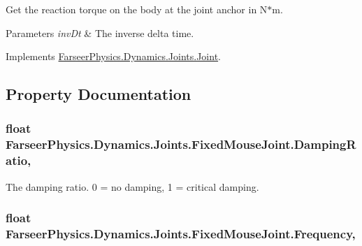 Get the reaction torque on the body at the joint anchor in N$\ast$m. 


\begin{DoxyParams}{Parameters}
{\em inv\+Dt} & The inverse delta time.\\
\hline
\end{DoxyParams}


Implements \hyperlink{class_farseer_physics_1_1_dynamics_1_1_joints_1_1_joint_a21899d3bdf15c22ef4dc288ed2082cbc}{Farseer\+Physics.\+Dynamics.\+Joints.\+Joint}.



\subsection{Property Documentation}
\hypertarget{class_farseer_physics_1_1_dynamics_1_1_joints_1_1_fixed_mouse_joint_a311969f45e435d7547b30c5adb8d4289}{
\subsubsection[{Damping\+Ratio}]{\setlength{\rightskip}{0pt plus 5cm}float Farseer\+Physics.\+Dynamics.\+Joints.\+Fixed\+Mouse\+Joint.\+Damping\+Ratio\hspace{0.3cm}{\ttfamily [get]}, {\ttfamily [set]}}}\label{class_farseer_physics_1_1_dynamics_1_1_joints_1_1_fixed_mouse_joint_a311969f45e435d7547b30c5adb8d4289}


The damping ratio. 0 = no damping, 1 = critical damping. 

\hypertarget{class_farseer_physics_1_1_dynamics_1_1_joints_1_1_fixed_mouse_joint_a44b8d829d42c0a2c057ab0671ef0fd83}{
\subsubsection[{Frequency}]{\setlength{\rightskip}{0pt plus 5cm}float Farseer\+Physics.\+Dynamics.\+Joints.\+Fixed\+Mouse\+Joint.\+Frequency\hspace{0.3cm}{\ttfamily [get]}, {\ttfamily [set]}}}\label{class_farseer_physics_1_1_dynamics_1_1_joints_1_1_fixed_mouse_joint_a44b8d829d42c0a2c057ab0671ef0fd83}


